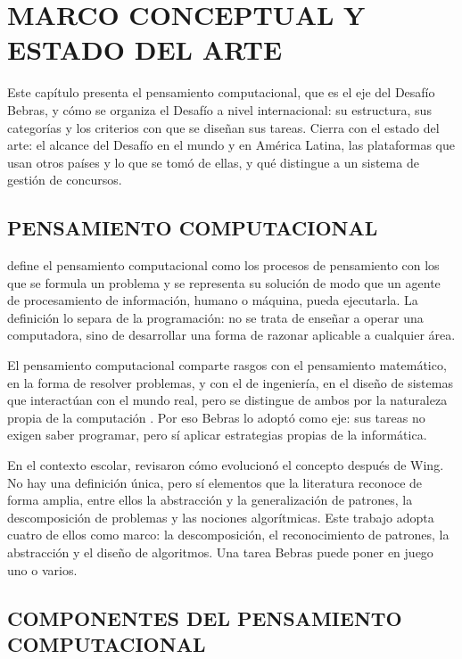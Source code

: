 \chapter{MARCO CONCEPTUAL Y ESTADO DEL ARTE}

Este capítulo presenta el pensamiento computacional, que es el eje del Desafío Bebras, y cómo se organiza el Desafío a nivel internacional: su estructura, sus categorías y los criterios con que se diseñan sus tareas. Cierra con el estado del arte: el alcance del Desafío en el mundo y en América Latina, las plataformas que usan otros países y lo que se tomó de ellas, y qué distingue a un sistema de gestión de concursos.

\section{PENSAMIENTO COMPUTACIONAL}

\textcite[33]{wing2006} define el pensamiento computacional como los procesos de pensamiento con los que se formula un problema y se representa su solución de modo que un agente de procesamiento de información, humano o máquina, pueda ejecutarla. La definición lo separa de la programación: no se trata de enseñar a operar una computadora, sino de desarrollar una forma de razonar aplicable a cualquier área.

El pensamiento computacional comparte rasgos con el pensamiento matemático, en la forma de resolver problemas, y con el de ingeniería, en el diseño de sistemas que interactúan con el mundo real, pero se distingue de ambos por la naturaleza propia de la computación \parencite[35]{wing2006}. Por eso Bebras lo adoptó como eje: sus tareas no exigen saber programar, pero sí aplicar estrategias propias de la informática.

En el contexto escolar, \textcite[39]{grover2013} revisaron cómo evolucionó el concepto después de Wing. No hay una definición única, pero sí elementos que la literatura reconoce de forma amplia, entre ellos la abstracción y la generalización de patrones, la descomposición de problemas y las nociones algorítmicas. Este trabajo adopta cuatro de ellos como marco: la descomposición, el reconocimiento de patrones, la abstracción y el diseño de algoritmos. Una tarea Bebras puede poner en juego uno o varios.

\section{COMPONENTES DEL PENSAMIENTO COMPUTACIONAL}

